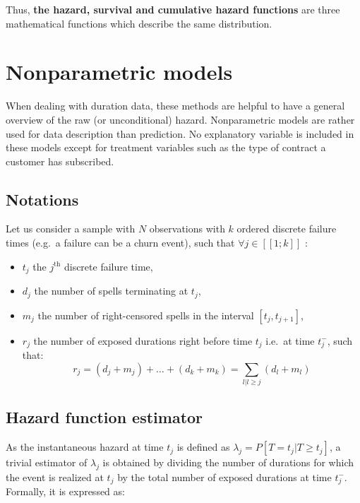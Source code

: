 \documentclass[
]{book}
\providecommand{\tightlist}{%
  \setlength{\itemsep}{0pt}\setlength{\parskip}{0pt}}
\begin{document}
Thus, \textbf{the hazard, survival and cumulative hazard functions} are three mathematical functions which describe the same distribution.

\hypertarget{nonparam}{%
\section{Nonparametric models}\label{nonparam}}

When dealing with duration data, these methods are helpful to have a general overview of the raw (or unconditional) hazard. Nonparametric models are rather used for data description than prediction. No explanatory variable is included in these models except for treatment variables such as the type of contract a customer has subscribed.

\hypertarget{notations}{%
\subsection{Notations}\label{notations}}

Let us consider a sample with \(N\) observations with \(k\) ordered discrete failure times (e.g.~a failure can be a churn event), such that \(\forall j \in [\![1; k]\!]\) :

\begin{itemize}
\tightlist
\item
  \(t_j\) the \(j^{\text{th}}\) discrete failure time,
\item
  \(d_j\) the number of spells terminating at \(t_j\),
\item
  \(m_j\) the number of right-censored spells in the interval \([t_j, t_{j+1}]\),
\item
  \(r_j\) the number of exposed durations right before time \(t_j\) i.e.~at time \(t_j^{-}\), such that:
  \begin{equation}
  r_j = (d_j + m_j) + \dots + (d_k + m_k) = \sum_{l|l \geq j} (d_l + m_l)
  \label{eq:exposed}
  \end{equation}
\end{itemize}

\hypertarget{hazard-function-estimator}{%
\subsection{Hazard function estimator}\label{hazard-function-estimator}}

As the instantaneous hazard at time \(t_j\) is defined as \(\lambda_j = P[T=t_j|T\geq t_j]\), a trivial estimator of \(\lambda_j\) is obtained by dividing the number of durations for which the event is realized at \(t_j\) by the total number of exposed durations at time \(t_j^{-}\). Formally, it is expressed as:
\end{document}
